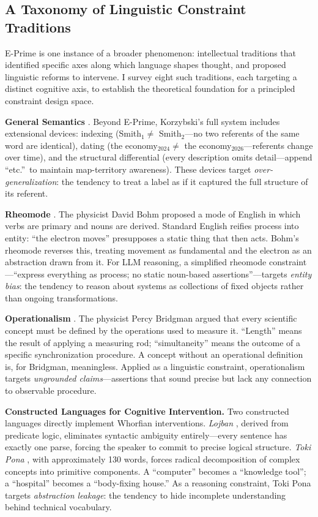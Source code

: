 \documentclass[11pt,a4paper]{article}
\begin{document}
\subsection{A Taxonomy of Linguistic Constraint Traditions}

E-Prime is one instance of a broader phenomenon: intellectual traditions that identified specific axes along which language shapes thought, and proposed linguistic reforms to intervene. I survey eight such traditions, each targeting a distinct cognitive axis, to establish the theoretical foundation for a principled constraint design space.

\textbf{General Semantics} \citep{korzybski1933}. Beyond E-Prime, Korzybski's full system includes extensional devices: indexing (Smith$_1 \neq$ Smith$_2$---no two referents of the same word are identical), dating (the economy$_{2024} \neq$ the economy$_{2026}$---referents change over time), and the structural differential (every description omits detail---append ``etc.''\ to maintain map-territory awareness). These devices target \emph{over-generalization}: the tendency to treat a label as if it captured the full structure of its referent.

\textbf{Rheomode} \citep{bohm1980}. The physicist David Bohm proposed a mode of English in which verbs are primary and nouns are derived. Standard English reifies process into entity: ``the electron moves'' presupposes a static thing that then acts. Bohm's rheomode reverses this, treating movement as fundamental and the electron as an abstraction drawn from it. For LLM reasoning, a simplified rheomode constraint---``express everything as process; no static noun-based assertions''---targets \emph{entity bias}: the tendency to reason about systems as collections of fixed objects rather than ongoing transformations.

\textbf{Operationalism} \citep{bridgman1927}. The physicist Percy Bridgman argued that every scientific concept must be defined by the operations used to measure it. ``Length'' means the result of applying a measuring rod; ``simultaneity'' means the outcome of a specific synchronization procedure. A concept without an operational definition is, for Bridgman, meaningless. Applied as a linguistic constraint, operationalism targets \emph{ungrounded claims}---assertions that sound precise but lack any connection to observable procedure.

\textbf{Constructed Languages for Cognitive Intervention.} Two constructed languages directly implement Whorfian interventions. \emph{Lojban} \citep{brown1955}, derived from predicate logic, eliminates syntactic ambiguity entirely---every sentence has exactly one parse, forcing the speaker to commit to precise logical structure. \emph{Toki Pona} \citep{lang2001}, with approximately 130 words, forces radical decomposition of complex concepts into primitive components. A ``computer'' becomes a ``knowledge tool''; a ``hospital'' becomes a ``body-fixing house.'' As a reasoning constraint, Toki Pona targets \emph{abstraction leakage}: the tendency to hide incomplete understanding behind technical vocabulary.
\end{document}
